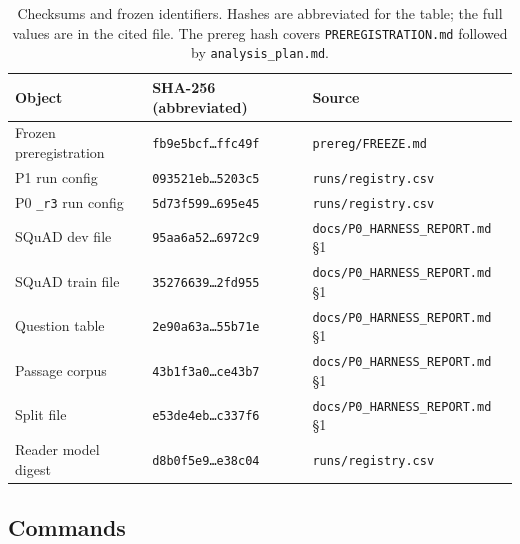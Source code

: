 \documentclass[a4paper,fleqn]{cas-sc}
\begin{document}
\begin{table}[pos=htbp]
  \centering
  \caption{Checksums and frozen identifiers. Hashes are abbreviated for the table; the full
  values are in the cited file. The prereg hash covers \texttt{PREREGISTRATION.md} followed by
  \texttt{analysis\_plan.md}.}
  \label{tab:hashes}
  \small
  \begin{tabularx}{\textwidth}{>{\raggedright\arraybackslash}p{5.0cm}>{\raggedright\arraybackslash}p{4.6cm}>{\raggedright\arraybackslash}X}
    \toprule
    \textbf{Object} & \textbf{SHA-256 (abbreviated)} & \textbf{Source} \\
    \midrule
    Frozen preregistration & \texttt{fb9e5bcf\ldots ffc49f} & \texttt{prereg/FREEZE.md} \\
    P1 run config & \texttt{093521eb\ldots 5203c5} & \texttt{runs/registry.csv} \\
    P0 \texttt{\_r3} run config & \texttt{5d73f599\ldots 695e45} & \texttt{runs/registry.csv} \\
    SQuAD dev file & \texttt{95aa6a52\ldots 6972c9} & \texttt{docs/P0\_HARNESS\_REPORT.md} \S1 \\
    SQuAD train file & \texttt{35276639\ldots 2fd955} & \texttt{docs/P0\_HARNESS\_REPORT.md} \S1 \\
    Question table & \texttt{2e90a63a\ldots 55b71e} & \texttt{docs/P0\_HARNESS\_REPORT.md} \S1 \\
    Passage corpus & \texttt{43b1f3a0\ldots ce43b7} & \texttt{docs/P0\_HARNESS\_REPORT.md} \S1 \\
    Split file & \texttt{e53de4eb\ldots c337f6} & \texttt{docs/P0\_HARNESS\_REPORT.md} \S1 \\
    Reader model digest & \texttt{d8b0f5e9\ldots e38c04} & \texttt{runs/registry.csv} \\
    \bottomrule
  \end{tabularx}
\end{table}

\subsection{Commands}
\end{document}
